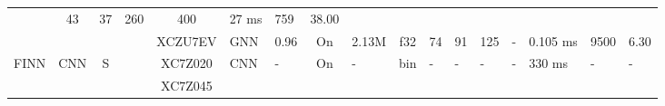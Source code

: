 \documentclass{article}
\begin{document}
\begin{table}
\begin{adjustbox}{totalheight=\baselineskip,}
\begin{tabular}{ccccclp{2em}cp{3em}cp{2em}p{4em}p{3em}p{3.5em}p{3.5em}p{2.5em}p{3em}}
                                       &\multirow{1}{*}{43}
                                           &\multirow{1}{*}{37}
                                               &\multirow{1}{*}{260}
                                                   &\multirow{1}{*}{400}
                                                       &\multirow{1}{*}{27 ms}
                                                           &\multirow{1}{*}{759}
                                                               &\multirow{1}{*}{38.00}\\
\cmidrule{4-17}
   &   &   &\multirow{1}{*}{\cite{zhangAccurateLowlatencyEfficient2022a}}
               &\multirow{1}{*}{XCZU7EV}
                   &\multirow{1}{*}{GNN}
                       &\multirow{1}{*}{0.96}
                           &\multirow{1}{*}{On}
                               &\multirow{1}{*}{2.13M}
                                   &\multirow{1}{*}{f32}
                                       &\multirow{1}{*}{74}
                                           &\multirow{1}{*}{91}
                                               &\multirow{1}{*}{125}
                                                   &\multirow{1}{*}{-}
                                                       &\multirow{1}{*}{0.105 ms}
                                                           &\multirow{1}{*}{9500}
                                                               &\multirow{1}{*}{6.30}\\
\cmidrule{1-17}
\multirow{4}{*}{FINN}
   &\multirow{4}{*}{CNN}
       &\multirow{4}{*}{S}
           &\multirow{1}{*}{\cite{hashimotoShipClassificationSAR2019a}}
               &\multirow{1}{*}{XC7Z020}
                   &\multirow{1}{*}{CNN}
                       &\multirow{1}{*}{-}
                           &\multirow{1}{*}{On}
                               &\multirow{1}{*}{-}
                                   &\multirow{1}{*}{bin}
                                       &\multirow{1}{*}{-}
                                           &\multirow{1}{*}{-}
                                               &\multirow{1}{*}{-}
                                                   &\multirow{1}{*}{-}
                                                       &\multirow{1}{*}{330 ms}
                                                           &\multirow{1}{*}{-}
                                                               &\multirow{1}{*}{-}\\
\cmidrule{4-17}
   &   &   &\multirow{1}{*}{\cite{myojinDetectingUncertainBNN2020}}
               &\multirow{1}{*}{XC7Z045}

\end{tabular}
\end{adjustbox}
\end{table}
\end{document}

